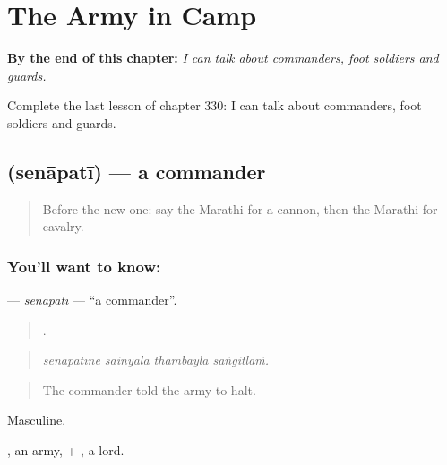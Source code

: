 
\chapter{The Army in Camp}
\label{ch:mr-the-army-in-camp}

\begin{chapteropening}
\textbf{By the end of this chapter:} \emph{I can talk about commanders, foot soldiers and guards.}

Complete the last lesson of chapter 330: I can talk about commanders, foot soldiers and guards.
\end{chapteropening}

\section[\texorpdfstring{\mr{सेनापती} (senāpatī)}{सेनापती (senāpatī)}]{ (senāpatī) — a commander}

\label{lesson:MR-C330-senapati}



\begin{quote}
Before the new one: say the Marathi for a cannon, then the Marathi for cavalry.
\end{quote}

\subsection*{You'll want to know: }
\textbf{} — \emph{senāpatī} — \textquotedblleft{}a commander\textquotedblright{}.

\begin{quote}
   .
\end{quote}

\begin{quote}
\emph{senāpatīne sainyālā thāmbāylā sāṅgitlaṁ.}
\end{quote}

\begin{quote}
The commander told the army to halt.
\end{quote}

Masculine.

, an army, + , a lord.

